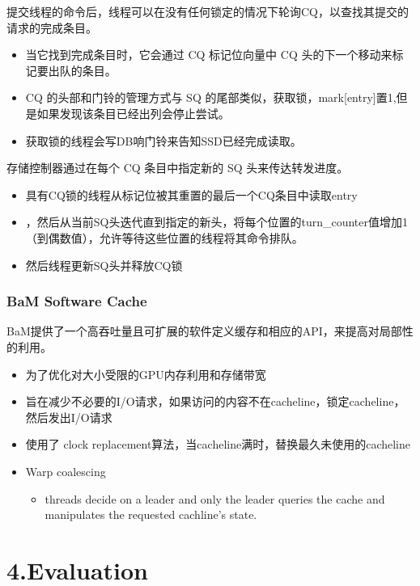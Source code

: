 \documentclass[10pt]{ctexbeamer}
\begin{document}
\begin{frame}
  提交线程的命令后，线程可以在没有任何锁定的情况下轮询CQ，以查找其提交的请求的完成条目。
  \begin{itemize}
    \item 当它找到完成条目时，它会通过 CQ 标记位向量中 CQ 头的下一个移动来标记要出队的条目。
    \item CQ 的头部和门铃的管理方式与 SQ 的尾部类似，获取锁，mark[entry]置1,但是如果发现该条目已经出列会停止尝试。
    \item 获取锁的线程会写DB响门铃来告知SSD已经完成读取。
  \end{itemize}
  存储控制器通过在每个 CQ 条目中指定新的 SQ 头来传达转发进度。
  \begin{itemize}
    \item  具有CQ锁的线程从标记位被其重置的最后一个CQ条目中读取entry
    \item   ，然后从当前SQ头迭代直到指定的新头，将每个位置的turn\_counter值增加1（到偶数值），允许等待这些位置的线程将其命令排队。
    \item   然后线程更新SQ头并释放CQ锁
  \end{itemize}
\end{frame}

\begin{frame}
  \frametitle{BaM Software Cache}
  BaM提供了一个高吞吐量且可扩展的软件定义缓存和相应的API，来提高对局部性的利用。
  \begin{itemize}
    \item 为了优化对大小受限的GPU内存利用和存储带宽
    \item 旨在减少不必要的I/O请求，如果访问的内容不在cacheline，锁定cacheline，然后发出I/O请求
    \item 使用了 clock replacement算法，当cacheline满时，替换最久未使用的cacheline
    \item Warp coalescing 
    \begin{itemize}
      \item threads decide on a leader and only the leader queries the cache and manipulates the requested cachline's state.
    \end{itemize}
  \end{itemize}
\end{frame}


\section[4.Evaluation]{4.Evaluation}\label{sec:4}
\end{document}
